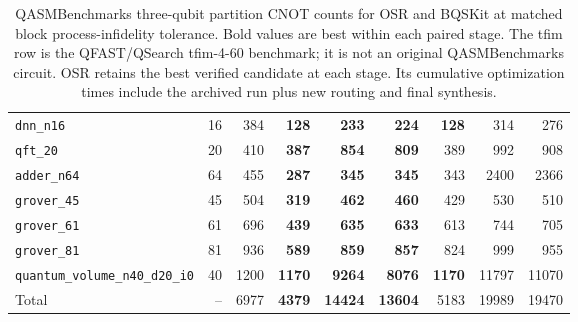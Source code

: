 \begin{table}[p]
\begin{tabular}{lrr|rrr|rrr}
\texttt{dnn\_n16} & 16 & 384 & \textbf{128} & \textbf{233} & \textbf{224} & \textbf{128} & 314 & 276 \\
\texttt{qft\_20} & 20 & 410 & \textbf{387} & \textbf{854} & \textbf{809} & 389 & 992 & 908 \\
\texttt{adder\_n64} & 64 & 455 & \textbf{287} & \textbf{345} & \textbf{345} & 343 & 2400 & 2366 \\
\texttt{grover\_45} & 45 & 504 & \textbf{319} & \textbf{462} & \textbf{460} & 429 & 530 & 510 \\
\texttt{grover\_61} & 61 & 696 & \textbf{439} & \textbf{635} & \textbf{633} & 613 & 744 & 705 \\
\texttt{grover\_81} & 81 & 936 & \textbf{589} & \textbf{859} & \textbf{857} & 824 & 999 & 955 \\
\texttt{quantum\_volume\_n40\_d20\_i0} & 40 & 1200 & \textbf{1170} & \textbf{9264} & \textbf{8076} & \textbf{1170} & 11797 & 11070 \\
\hline
Total & -- & 6977 & \textbf{4379} & \textbf{14424} & \textbf{13604} & 5183 & 19989 & 19470 \\
\hline
\end{tabular}
\caption{QASMBenchmarks three-qubit partition CNOT counts for OSR and BQSKit at matched block process-infidelity tolerance. Bold values are best within each paired stage. The tfim row is the QFAST/QSearch tfim-4-60 benchmark; it is not an original QASMBenchmarks circuit. OSR retains the best verified candidate at each stage. Its cumulative optimization times include the archived run plus new routing and final synthesis.}
\label{tab:osr-bqskit-three-qubit-qasm-benchmarks-counts}
\end{table}

